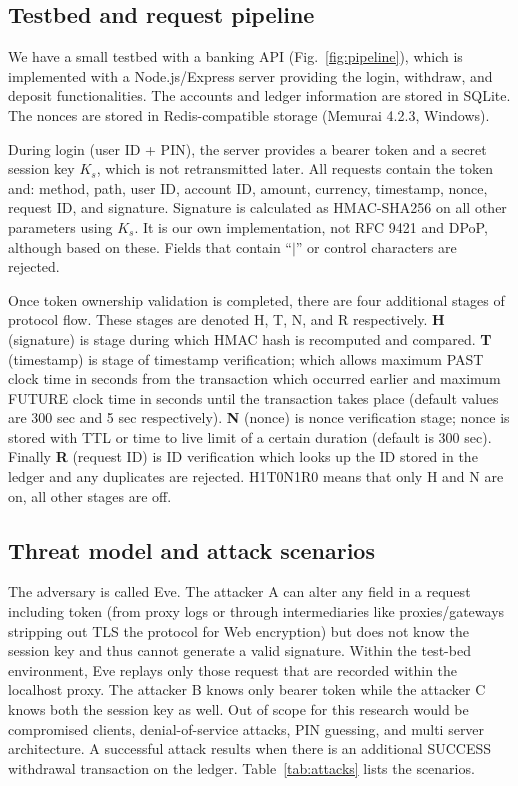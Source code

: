 \documentclass[conference]{IEEEtran}
\begin{document}
\subsection{Testbed and request pipeline}
We have a small testbed with a banking API (Fig.~\ref{fig:pipeline}), which is implemented with a Node.js/Express server providing the login, withdraw, and deposit functionalities. The accounts and ledger information are stored in SQLite. The nonces are stored in Redis-compatible storage (Memurai 4.2.3, Windows).

During login (user ID + PIN), the server provides a bearer token and a secret session key $K_s$, which is not retransmitted later. All requests contain the token and: method, path, user ID, account ID, amount, currency, timestamp, nonce, request ID, and signature. Signature is calculated as HMAC-SHA256 on all other parameters using $K_s$. It is our own implementation, not RFC 9421 and DPoP, although based on these. Fields that contain ``$|$'' or control characters are rejected.

Once token ownership validation is completed, there are four additional stages of protocol flow. These stages are denoted H, T, N, and R respectively. \textbf{H} (signature) is stage during which HMAC hash is recomputed and compared. \textbf{T} (timestamp) is stage of timestamp verification; which allows maximum PAST clock time in seconds from the transaction which occurred earlier and maximum FUTURE clock time in seconds until the transaction takes place (default values are 300 sec and 5 sec respectively). \textbf{N} (nonce) is nonce verification stage; nonce is stored with TTL or time to live limit of a certain duration (default is 300 sec). Finally \textbf{R} (request ID) is ID verification which looks up the ID stored in the ledger and any duplicates are rejected. H1T0N1R0 means that only H and N are on, all other stages are off. 

\subsection{Threat model and attack scenarios}
The adversary is called Eve. The attacker A can alter any field in a request including token (from proxy logs or through intermediaries like proxies/gateways stripping out TLS the protocol for Web encryption) but does not know the session key and thus cannot generate a valid signature. Within the test-bed environment, Eve replays only those request that are recorded within the localhost proxy. The attacker B knows only bearer token while the attacker C knows both the session key as well. Out of scope for this research would be compromised clients, denial-of-service attacks, PIN guessing, and multi server architecture. A successful attack results when there is an additional SUCCESS withdrawal transaction on the ledger. Table~\ref{tab:attacks} lists the scenarios.
\end{document}
